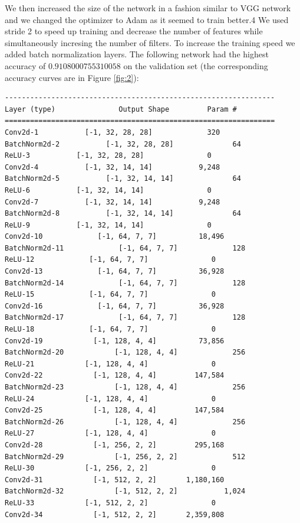 \documentclass [a4paper, 11pt] {article}
\begin{document}
\begin{enumerate}
We then increased the size of the network in a fashion similar to VGG network and we changed the optimizer to Adam as it seemed to train better.4 We used stride 2 to speed up training and decrease the number of features while simultaneously incresing the number of filters. To increase the training speed we added batch normalization layers. The following network had the highest accuracy of $0.9108000755310058$ on the validation set (the corresponding accuracy curves are in Figure \ref{fig:2}):

\begin{lstlisting}
----------------------------------------------------------------
Layer (type)               Output Shape         Param #
================================================================
Conv2d-1           [-1, 32, 28, 28]             320
BatchNorm2d-2           [-1, 32, 28, 28]              64
ReLU-3           [-1, 32, 28, 28]               0
Conv2d-4           [-1, 32, 14, 14]           9,248
BatchNorm2d-5           [-1, 32, 14, 14]              64
ReLU-6           [-1, 32, 14, 14]               0
Conv2d-7           [-1, 32, 14, 14]           9,248
BatchNorm2d-8           [-1, 32, 14, 14]              64
ReLU-9           [-1, 32, 14, 14]               0
Conv2d-10             [-1, 64, 7, 7]          18,496
BatchNorm2d-11             [-1, 64, 7, 7]             128
ReLU-12             [-1, 64, 7, 7]               0
Conv2d-13             [-1, 64, 7, 7]          36,928
BatchNorm2d-14             [-1, 64, 7, 7]             128
ReLU-15             [-1, 64, 7, 7]               0
Conv2d-16             [-1, 64, 7, 7]          36,928
BatchNorm2d-17             [-1, 64, 7, 7]             128
ReLU-18             [-1, 64, 7, 7]               0
Conv2d-19            [-1, 128, 4, 4]          73,856
BatchNorm2d-20            [-1, 128, 4, 4]             256
ReLU-21            [-1, 128, 4, 4]               0
Conv2d-22            [-1, 128, 4, 4]         147,584
BatchNorm2d-23            [-1, 128, 4, 4]             256
ReLU-24            [-1, 128, 4, 4]               0
Conv2d-25            [-1, 128, 4, 4]         147,584
BatchNorm2d-26            [-1, 128, 4, 4]             256
ReLU-27            [-1, 128, 4, 4]               0
Conv2d-28            [-1, 256, 2, 2]         295,168
BatchNorm2d-29            [-1, 256, 2, 2]             512
ReLU-30            [-1, 256, 2, 2]               0
Conv2d-31            [-1, 512, 2, 2]       1,180,160
BatchNorm2d-32            [-1, 512, 2, 2]           1,024
ReLU-33            [-1, 512, 2, 2]               0
Conv2d-34            [-1, 512, 2, 2]       2,359,808

\end{lstlisting}
\end{enumerate}
\end{document}
